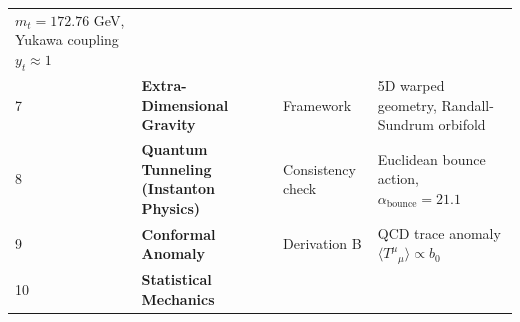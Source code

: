 \documentclass[
  11pt,
]{article}
\begin{document}
\begin{longtable}[]{@{}llll@{}}
\begin{minipage}[t]{0.29\columnwidth}
\(m_t = 172.76\) GeV, Yukawa coupling \(y_t \approx 1\)\strut
\end{minipage}\tabularnewline
\begin{minipage}[t]{0.04\columnwidth}\raggedright
7\strut
\end{minipage} & \begin{minipage}[t]{0.27\columnwidth}\raggedright
\textbf{Extra-Dimensional Gravity}\strut
\end{minipage} & \begin{minipage}[t]{0.29\columnwidth}\raggedright
Framework\strut
\end{minipage} & \begin{minipage}[t]{0.29\columnwidth}\raggedright
5D warped geometry, Randall-Sundrum orbifold\strut
\end{minipage}\tabularnewline
\begin{minipage}[t]{0.04\columnwidth}\raggedright
8\strut
\end{minipage} & \begin{minipage}[t]{0.27\columnwidth}\raggedright
\textbf{Quantum Tunneling (Instanton Physics)}\strut
\end{minipage} & \begin{minipage}[t]{0.29\columnwidth}\raggedright
Consistency check\strut
\end{minipage} & \begin{minipage}[t]{0.29\columnwidth}\raggedright
Euclidean bounce action, \(\alpha_{\text{bounce}} = 21.1\)\strut
\end{minipage}\tabularnewline
\begin{minipage}[t]{0.04\columnwidth}\raggedright
9\strut
\end{minipage} & \begin{minipage}[t]{0.27\columnwidth}\raggedright
\textbf{Conformal Anomaly}\strut
\end{minipage} & \begin{minipage}[t]{0.29\columnwidth}\raggedright
Derivation B\strut
\end{minipage} & \begin{minipage}[t]{0.29\columnwidth}\raggedright
QCD trace anomaly \(\langle T^\mu{}_\mu \rangle \propto b_0\)\strut
\end{minipage}\tabularnewline
\begin{minipage}[t]{0.04\columnwidth}\raggedright
10\strut
\end{minipage} & \begin{minipage}[t]{0.27\columnwidth}\raggedright
\textbf{Statistical Mechanics}\strut

\end{minipage}
\end{longtable}
\end{document}
